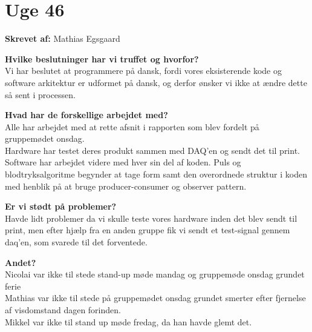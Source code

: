 \section{Uge 46}

\textbf{Skrevet af:} Mathias Egsgaard

\textbf{Hvilke beslutninger har vi truffet og hvorfor?}\\
Vi har beslutet at programmere på dansk, fordi vores eksisterende kode og software arkitektur er udformet på dansk, og derfor ønsker vi ikke at ændre dette så sent i processen. 

\textbf{Hvad har de forskellige arbejdet med?} \\
Alle har arbejdet med at rette afsnit i rapporten som blev fordelt på gruppemødet onsdag. \\
Hardware har testet deres produkt sammen med DAQ’en og sendt det til print. \\
Software har arbejdet videre med hver sin del af koden. Puls og blodtryksalgoritme begynder at tage form samt den overordnede struktur i koden med henblik på at bruge producer-consumer og observer pattern. 

\textbf{Er vi stødt på problemer?}\\
Havde lidt problemer da vi skulle teste vores hardware inden det blev sendt til print, men efter hjælp fra en anden gruppe fik vi sendt et test-signal gennem daq’en, som svarede til det forventede.

\textbf{Andet?}\\
Nicolai var ikke til stede stand-up møde mandag og gruppemøde onsdag grundet ferie \\
Mathias var ikke til stede på gruppemødet onsdag grundet smerter efter fjernelse af visdomstand dagen forinden. \\
Mikkel var ikke til stand up møde fredag, da han havde glemt det.

\clearpage
